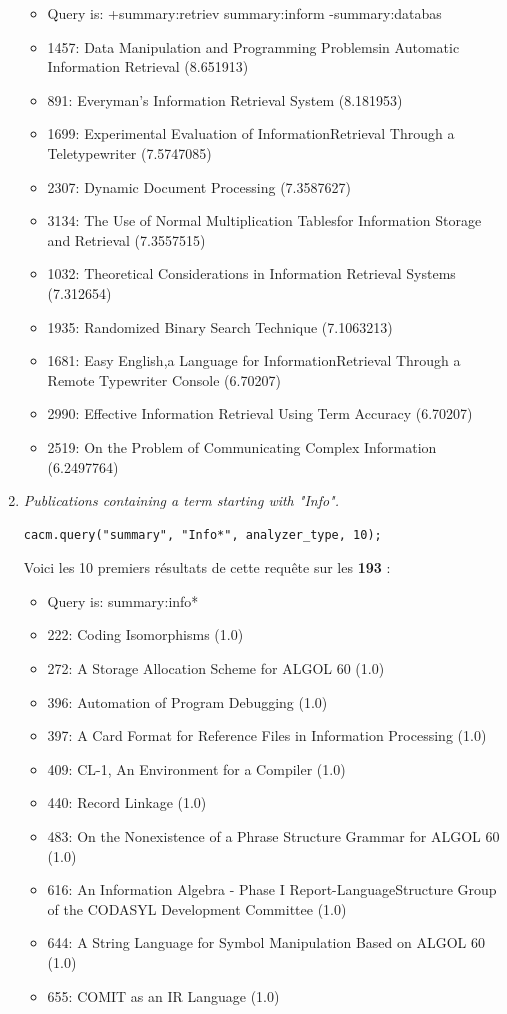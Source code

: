 \begin{enumerate}
\begin{itemize}
    \item Query is: +summary:retriev summary:inform -summary:databas
    \item 1457: Data Manipulation and Programming Problemsin Automatic Information Retrieval (8.651913)
    \item 891: Everyman's Information Retrieval System (8.181953)
    \item 1699: Experimental Evaluation of InformationRetrieval Through a Teletypewriter (7.5747085)
    \item 2307: Dynamic Document Processing (7.3587627)
    \item 3134: The Use of Normal Multiplication Tablesfor Information Storage and Retrieval (7.3557515)
    \item 1032: Theoretical Considerations in Information Retrieval Systems (7.312654)
    \item 1935: Randomized Binary Search Technique (7.1063213)
    \item 1681: Easy English,a Language for InformationRetrieval Through a Remote Typewriter Console (6.70207)
    \item 2990: Effective Information Retrieval Using Term Accuracy (6.70207)
    \item 2519: On the Problem of Communicating Complex Information (6.2497764)
\end{itemize}

\item \textit{Publications containing a term starting with "Info".}

\begin{lstlisting}
cacm.query("summary", "Info*", analyzer_type, 10);
\end{lstlisting}

Voici les 10 premiers résultats de cette requête sur les \textbf{193} :

\begin{itemize}
    \item Query is: summary:info*
    \item 222: Coding Isomorphisms (1.0)
    \item 272: A Storage Allocation Scheme for ALGOL 60 (1.0)
    \item 396: Automation of Program  Debugging (1.0)
    \item 397: A Card Format for Reference Files in Information Processing (1.0)
    \item 409: CL-1, An Environment for a Compiler (1.0)
    \item 440: Record Linkage (1.0)
    \item 483: On the Nonexistence of a Phrase Structure Grammar for ALGOL 60 (1.0)
    \item 616: An Information Algebra - Phase I Report-LanguageStructure Group of the CODASYL Development Committee (1.0)
    \item 644: A String Language for Symbol Manipulation Based on ALGOL 60 (1.0)
    \item 655: COMIT as an IR Language (1.0)
\end{itemize}


\end{enumerate}
